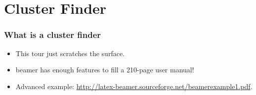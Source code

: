\documentclass{beamer}
\begin{document}
\section{Cluster Finder}

\begin{frame}
\frametitle{What is a cluster finder} 

\begin{itemize}

\item This tour just scratches the surface.  
\pause

\item {\sc beamer} has enough features to fill a 210-page user manual!  
\pause

\item Advanced example:
\url{http://latex-beamer.sourceforge.net/beamerexample1.pdf}.

\end{itemize}

\end{frame}
\end{document}
